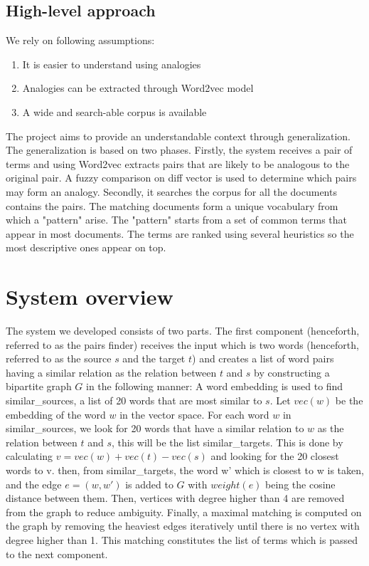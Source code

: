 \documentclass[11pt,a4paper]{article}
\begin{document}
\subsection{High-level approach}
We rely on following assumptions:
\begin{enumerate}
\item It is easier to understand using analogies
\item Analogies can be extracted through Word2vec model
\item A wide and search-able corpus is available
\end{enumerate}
The project aims to provide an understandable context through generalization. The generalization is based on two phases. Firstly, the system receives a pair of terms and using Word2vec extracts pairs that are likely to be analogous to the original pair. A fuzzy comparison on diff vector is used to determine which pairs may form an analogy. Secondly, it searches the corpus for all the documents contains the pairs. The matching documents form a unique vocabulary from which a "pattern" arise. The "pattern" starts from a set of common terms that appear in most documents. The terms are ranked using several heuristics so the most descriptive ones appear on top.
\section{System overview}
The system we developed consists of two parts. The first component (henceforth, referred to as the pairs finder) receives the input which is two words (henceforth, referred to as the source $s$ and the target $t$) and creates a list of word pairs having a similar relation as the relation between $t$ and $s$ by constructing a bipartite graph $G$ in the following manner: 
A word embedding is used to find similar\_sources, a list of 20 words that are most similar to $s$. Let $vec(w)$ be the embedding of the word $w$ in the vector space. For each word $w$ in similar\_sources, we look for 20 words that have a similar relation to $w$ as the relation between $t$ and $s$, this will be the list similar\_targets. This is done by calculating $v = vec(w) + vec(t) - vec(s)$ and looking for the 20 closest words to v. then, from similar\_targets, the word w' which is closest to w is taken, and the edge $e=(w, w')$ is added to $G$ with $weight(e)$ being the cosine distance between them. Then, vertices with degree higher than 4 are removed from the graph to reduce ambiguity. Finally, a maximal matching is computed on the graph by removing the heaviest edges iteratively until there is no vertex with degree higher than 1. This matching constitutes the list of terms which is passed to the next component.
\end{document}
